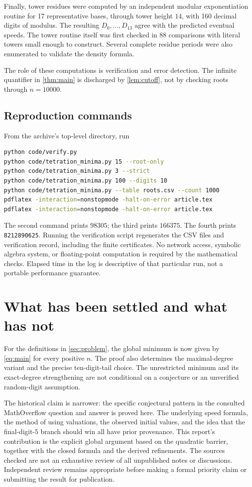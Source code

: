 \documentclass[11pt,a4paper]{article}
\theoremstyle{definition}
\begin{document}
Finally, tower residues were computed by an independent modular
exponentiation routine for 17 representative bases, through tower
height $14$, with 160 decimal digits of modulus. The resulting
$D_0,\ldots,D_{13}$ agree with the predicted eventual speeds. The tower
routine itself was first checked in 88 comparisons with literal towers
small enough to construct. Several complete residue periods were also
enumerated to validate the density formula.

The role of these computations is verification and error detection.
The infinite quantifier in \cref{thm:main} is discharged by
\cref{lem:cutoff}, not by checking roots through $n=10000$.

\subsection{Reproduction commands}
From the archive's top-level directory, run
\begin{lstlisting}[language=bash]
python code/verify.py
python code/tetration_minima.py 15 --root-only
python code/tetration_minima.py 3 --strict
python code/tetration_minima.py 100 --digits 10
python code/tetration_minima.py --table roots.csv --count 1000
pdflatex -interaction=nonstopmode -halt-on-error article.tex
pdflatex -interaction=nonstopmode -halt-on-error article.tex
\end{lstlisting}
The second command prints $98305$; the third prints $166375$.
The fourth prints \texttt{8212890625}. Running the verification script
regenerates the CSV files and verification record, including the
finite certificates. No network access, symbolic algebra system, or
floating-point computation is required by the mathematical checks.
Elapsed time in the log is descriptive of that particular run, not a
portable performance guarantee.

\section{What has been settled and what has not}
\label{sec:status}

For the definitions in \cref{sec:problem}, the global minimum is now
given by \eqref{eq:main} for every positive $n$. The proof also determines
the maximal-degree variant and the precise ten-digit-tail choice.
The unrestricted minimum and its exact-degree strengthening are not
conditional on a conjecture or an unverified random-digit assumption.

The historical claim is narrower: the specific conjectural pattern in
the consulted MathOverflow question and answer is proved here. The
underlying speed formula, the method of using valuations, the observed
initial values, and the idea that the final-digit-$5$ branch should
win all have prior provenance. This report's contribution is the
explicit global argument based on the quadratic barrier, together with
the closed formula and the derived refinements. The sources checked
are not an exhaustive review of all unpublished notes or discussions.
Independent review remains appropriate before making a formal priority
claim or submitting the result for publication.
\end{document}
